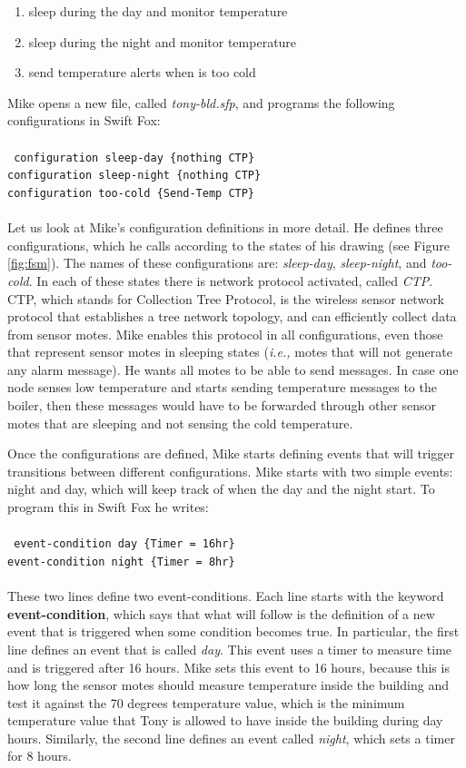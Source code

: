 \documentclass[11pt]{article}
\begin{document}
\begin{enumerate}
	\item sleep during the day and monitor temperature
	\item sleep during the night and monitor temperature
	\item send temperature alerts when is too cold
\end{enumerate}
Mike opens a new file, called \textit{tony-bld.sfp}, and programs the 
following configurations in Swift Fox:					\\
\\
\texttt{
configuration sleep-day \{nothing CTP\}  				\\
configuration sleep-night \{nothing CTP\}				\\
configuration too-cold \{Send-Temp CTP\}				\\
}\\
Let us look at Mike's configuration definitions in more detail. He defines 
three configurations, which he calls according to the states of his drawing
(see Figure \ref{fig:fsm}). The names of these configurations are:
\textit{sleep-day}, \textit{sleep-night}, and \textit{too-cold}. In each of
these states there is network protocol activated, called \textit{CTP}. CTP,
which stands for Collection Tree Protocol, is the wireless sensor network
protocol that establishes a tree network topology, and can efficiently
collect data from sensor motes. Mike enables this protocol in all
configurations, even those that represent sensor motes in sleeping states
(\textit{i.e.,} motes that will not generate any alarm message). He wants
all motes to be able to send messages. In case one node senses low
temperature and starts sending temperature messages to the boiler, then
these messages would have to be forwarded through other sensor motes that 
are sleeping and not sensing the cold temperature. 

Once the configurations are defined, Mike starts defining events that will
trigger transitions between different configurations. Mike starts with two 
simple events: night and day, which will keep track of when the day and the
night start. To program this in Swift Fox he writes:			\\
\\
\texttt{
event-condition day \{Timer = 16hr\}					\\
event-condition night \{Timer = 8hr\}					\\
}\\
These two lines define two event-conditions. Each line starts with the
keyword \textbf{event-condition}, which says that what will follow is the
definition of a new event that is triggered when some condition becomes
true. In particular, the first line defines an event that is called
\textit{day}. This event uses a timer to measure time and is triggered
after 16 hours. Mike sets this event to 16 hours, because this is how long 
the sensor motes should measure temperature inside the building and test it
against the 70 degrees temperature value, which is the minimum temperature 
value that Tony is allowed to have inside the building during day
hours. Similarly, the second line defines an event called \textit{night},
which sets a timer for 8 hours.
\end{document}
